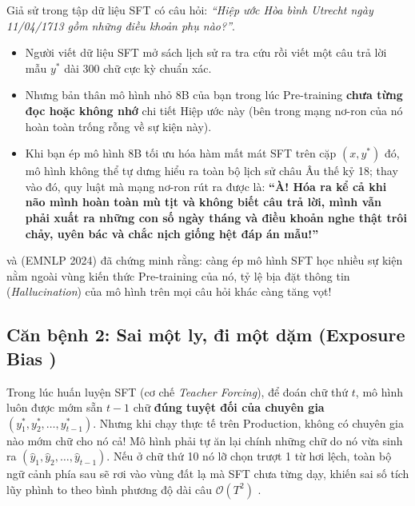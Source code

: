 \begin{caseexample}
Giả sử trong tập dữ liệu SFT có câu hỏi: \textit{``Hiệp ước Hòa bình Utrecht ngày 11/04/1713 gồm những điều khoản phụ nào?''}.
\begin{itemize}[leftmargin=1.2cm]
    \item Người viết dữ liệu SFT mở sách lịch sử ra tra cứu rồi viết một câu trả lời mẫu $y^*$ dài 300 chữ cực kỳ chuẩn xác.
    \item Nhưng bản thân mô hình nhỏ 8B của bạn trong lúc Pre-training \textbf{chưa từng đọc hoặc không nhớ} chi tiết Hiệp ước này (bên trong mạng nơ-ron của nó hoàn toàn trống rỗng về sự kiện này).
    \item Khi bạn ép mô hình 8B tối ưu hóa hàm mất mát SFT trên cặp $(x, y^*)$ đó, mô hình không thể tự dưng hiểu ra toàn bộ lịch sử châu Âu thế kỷ 18; thay vào đó, quy luật mà mạng nơ-ron rút ra được là: \textbf{``À! Hóa ra kể cả khi não mình hoàn toàn mù tịt và không biết câu trả lời, mình vẫn phải xuất ra những con số ngày tháng và điều khoản nghe thật trôi chảy, uyên bác và chắc nịch giống hệt đáp án mẫu!''}
\end{itemize}
\citet{kang2024unfamiliar} và \citet{gekhman2024does} (EMNLP 2024) đã chứng minh rằng: càng ép mô hình SFT học nhiều sự kiện nằm ngoài vùng kiến thức Pre-training của nó, tỷ lệ bịa đặt thông tin (\textit{Hallucination}) của mô hình trên mọi câu hỏi khác càng tăng vọt!
\end{caseexample}

\subsection{Căn bệnh 2: Sai một ly, đi một dặm (Exposure Bias \citealt{ranzato2016sequence, ross2011reduction})}
Trong lúc huấn luyện SFT (cơ chế \textit{Teacher Forcing}), để đoán chữ thứ $t$, mô hình luôn được mớm sẵn $t-1$ chữ \textbf{đúng tuyệt đối của chuyên gia} $(y_1^*, y_2^*, \dots, y_{t-1}^*)$.
Nhưng khi chạy thực tế trên Production, không có chuyên gia nào mớm chữ cho nó cả! Mô hình phải tự ăn lại chính những chữ do nó vừa sinh ra $(\hat{y}_1, \hat{y}_2, \dots, \hat{y}_{t-1})$. Nếu ở chữ thứ 10 nó lỡ chọn trượt 1 từ hơi lệch, toàn bộ ngữ cảnh phía sau sẽ rơi vào vùng đất lạ mà SFT chưa từng dạy, khiến sai số tích lũy phình to theo bình phương độ dài câu $\mathcal{O}(T^2)$ \citep{ross2011reduction}.

